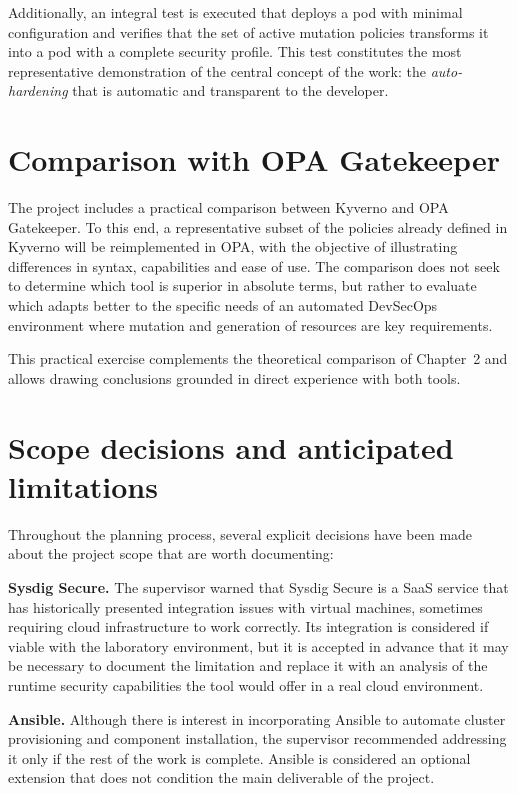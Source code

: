 Additionally, an integral test is executed that deploys a pod with minimal configuration and verifies that the set of active mutation policies transforms it into a pod with a complete security profile. This test constitutes the most representative demonstration of the central concept of the work: the \textit{auto-hardening} that is automatic and transparent to the developer.

\section{Comparison with OPA Gatekeeper}

The project includes a practical comparison between Kyverno and OPA Gatekeeper. To this end, a representative subset of the policies already defined in Kyverno will be reimplemented in OPA, with the objective of illustrating differences in syntax, capabilities and ease of use. The comparison does not seek to determine which tool is superior in absolute terms, but rather to evaluate which adapts better to the specific needs of an automated DevSecOps environment where mutation and generation of resources are key requirements.

This practical exercise complements the theoretical comparison of Chapter~2 and allows drawing conclusions grounded in direct experience with both tools.

\section{Scope decisions and anticipated limitations}

Throughout the planning process, several explicit decisions have been made about the project scope that are worth documenting:

\textbf{Sysdig Secure.} The supervisor warned that Sysdig Secure is a SaaS service that has historically presented integration issues with virtual machines, sometimes requiring cloud infrastructure to work correctly. Its integration is considered if viable with the laboratory environment, but it is accepted in advance that it may be necessary to document the limitation and replace it with an analysis of the runtime security capabilities the tool would offer in a real cloud environment.

\textbf{Ansible.} Although there is interest in incorporating Ansible to automate cluster provisioning and component installation, the supervisor recommended addressing it only if the rest of the work is complete. Ansible is considered an optional extension that does not condition the main deliverable of the project.

